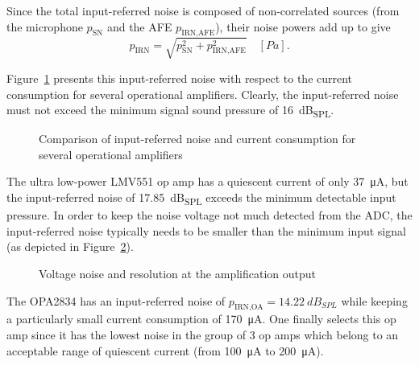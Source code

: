 \documentclass{EPL-master-thesis-covers-EN}
\newcommand{\te}[1]{\textrm{#1}}
\begin{document}
Since the total input-referred noise is composed of non-correlated sources (from the microphone $p_{\te{SN}}$ and the AFE $ p_\te{IRN,AFE}$), their noise powers add up to give
\[
 p_\te{IRN} = \sqrt{p_{\te{SN}}^2 + p_\te{IRN,AFE}^2} \quad \si{[Pa]}.
\]

Figure~\ref{fig:output_noise_op_amp} presents this input-referred noise with respect to the current consumption for several operational amplifiers. Clearly, the input-referred noise must not exceed the minimum signal sound pressure of \SI{16}{dB_{SPL}}.

\begin{figure}[H]
    \centering
    
    \caption{Comparison of input-referred noise and current consumption for several operational amplifiers}
    \label{fig:output_noise_op_amp}
\end{figure}

The ultra low-power LMV551 op amp has a quiescent current of only \SI{37}{\micro A}, but the input-referred noise of \SI{17.85}{dB_{SPL}} exceeds the minimum detectable input pressure.
In order to keep the noise voltage not much detected from the ADC, the input-referred noise typically needs to be smaller than the minimum input signal (as depicted in Figure~\ref{fig:ADC_res_noise}).

\begin{figure}[H]
\centering
{}
\caption{Voltage noise and resolution at the amplification output}
\label{fig:ADC_res_noise}
\end{figure}

The OPA2834 has an input-referred noise of $p_\te{IRN,OA} = \SI{14.22}{dB_{SPL}}$ while keeping a particularly small current consumption of \SI{170}{\micro A}. One finally selects this op amp since it has the lowest noise in the group of 3 op amps which belong to an acceptable range of quiescent current (from \SI{100}{\micro A} to \SI{200}{\micro A}).
\end{document}
